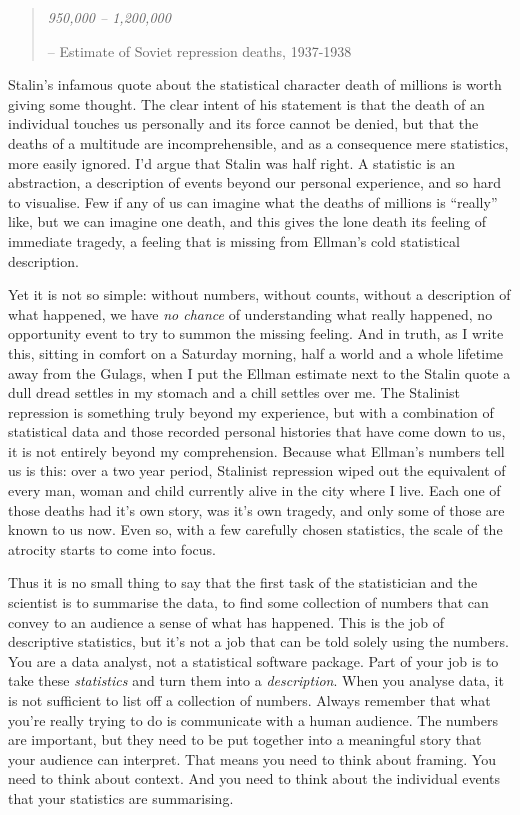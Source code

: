 \documentclass[
]{book}
\begin{document}
\begin{quote}
\emph{950,000 -- 1,200,000}

-- Estimate of Soviet repression deaths,
1937-1938 \citep{Ellman2002}
\end{quote}

Stalin's infamous quote about the statistical character death of millions is worth giving some thought. The clear intent of his statement is that the death of an individual touches us personally and its force cannot be denied, but that the deaths of a multitude are incomprehensible, and as a consequence mere statistics, more easily ignored. I'd argue that Stalin was half right. A statistic is an abstraction, a description of events beyond our personal experience, and so hard to visualise. Few if any of us can imagine what the deaths of millions is ``really'' like, but we can imagine one death, and this gives the lone death its feeling of immediate tragedy, a feeling that is missing from Ellman's cold statistical description.

Yet it is not so simple: without numbers, without counts, without a description of what happened, we have \emph{no chance} of understanding what really happened, no opportunity event to try to summon the missing feeling. And in truth, as I write this, sitting in comfort on a Saturday morning, half a world and a whole lifetime away from the Gulags, when I put the Ellman estimate next to the Stalin quote a dull dread settles in my stomach and a chill settles over me. The Stalinist repression is something truly beyond my experience, but with a combination of statistical data and those recorded personal histories that have come down to us, it is not entirely beyond my comprehension. Because what Ellman's numbers tell us is this: over a two year period, Stalinist repression wiped out the equivalent of every man, woman and child currently alive in the city where I live. Each one of those deaths had it's own story, was it's own tragedy, and only some of those are known to us now. Even so, with a few carefully chosen statistics, the scale of the atrocity starts to come into focus.

Thus it is no small thing to say that the first task of the statistician and the scientist is to summarise the data, to find some collection of numbers that can convey to an audience a sense of what has happened. This is the job of descriptive statistics, but it's not a job that can be told solely using the numbers. You are a data analyst, not a statistical software package. Part of your job is to take these \emph{statistics} and turn them into a \emph{description}. When you analyse data, it is not sufficient to list off a collection of numbers. Always remember that what you're really trying to do is communicate with a human audience. The numbers are important, but they need to be put together into a meaningful story that your audience can interpret. That means you need to think about framing. You need to think about context. And you need to think about the individual events that your statistics are summarising.
\end{document}
